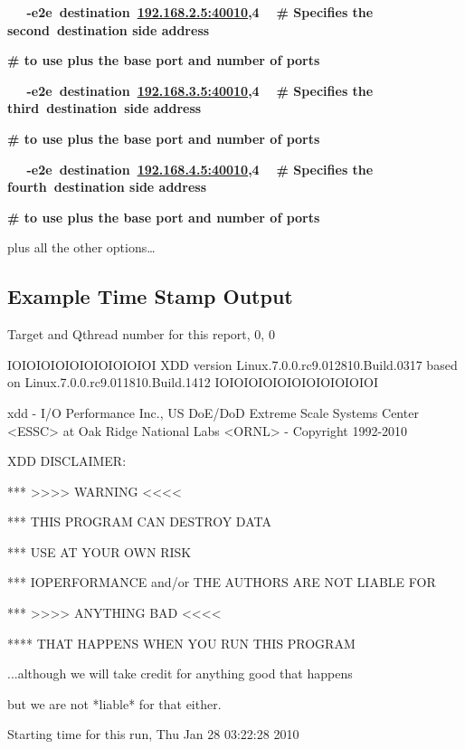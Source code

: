 \textbf{~~ -e2e~destination~\href{http://192.168.2.5:40010/}{192.168.2.5:40010},4 ~ \# Specifies the second~destination side address}

\textbf{\# to use plus the base port and number of ports}

\textbf{~~ -e2e~destination~\href{http://192.168.3.5:40010/}{192.168.3.5:40010},4 ~ \# Specifies the third~destination~side address}

\textbf{\# to use plus the base port and number of ports}

\textbf{~~ -e2e~destination~\href{http://192.168.4.5:40010/}{192.168.4.5:40010},4 ~ \# Specifies the fourth~destination side address}

\textbf{\# to use plus the base port and number of ports}

plus all the other options\ldots{}

\subsection{Example Time Stamp Output}\label{example-time-stamp-output}

Target and Qthread number for this report, 0, 0

IOIOIOIOIOIOIOIOIOIOI XDD version Linux.7.0.0.rc9.012810.Build.0317 based on Linux.7.0.0.rc9.011810.Build.1412 IOIOIOIOIOIOIOIOIOIOIOI

xdd - I/O Performance Inc., US DoE/DoD Extreme Scale Systems Center \textless ESSC\textgreater{} at Oak Ridge National Labs \textless ORNL\textgreater{} - Copyright 1992-2010

XDD DISCLAIMER:

*** \textgreater\textgreater\textgreater\textgreater{} WARNING \textless\textless\textless\textless{}

*** THIS PROGRAM CAN DESTROY DATA

*** USE AT YOUR OWN RISK

*** IOPERFORMANCE and/or THE AUTHORS ARE NOT LIABLE FOR

*** \textgreater\textgreater\textgreater\textgreater{} ANYTHING BAD \textless\textless\textless\textless{}

**** THAT HAPPENS WHEN YOU RUN THIS PROGRAM

...although we will take credit for anything good that happens

but we are not *liable* for that either.

Starting time for this run, Thu Jan 28 03:22:28 2010

